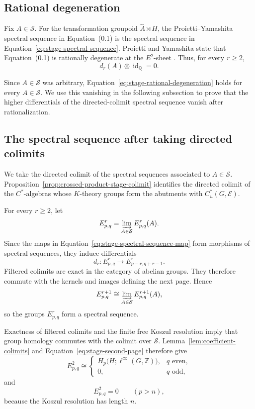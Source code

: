 \documentclass[pdflatex,sn-mathphys-num]{sn-jnl}%
\theoremstyle{plain}
\theoremstyle{remark}
\theoremstyle{definition}
\numberwithin{equation}{section}
\begin{document}
\subsection{Rational degeneration}

Fix \( A\in\mathcal S \). For the transformation groupoid \( \widehat A\rtimes H \), the Proietti--Yamashita spectral sequence in Equation~(0.1) is the spectral sequence in Equation~\eqref{eq:stage-spectral-sequence}. Proietti and Yamashita state that Equation~(0.1) is rationally degenerate at the \( E^2 \)-sheet \cite[p.~2, Equation~(0.1) and the paragraph following it]{proietti2025chern}. Thus, for every \( r\geq2 \),
\begin{equation}
\label{eq:stage-rational-degeneration}
d_r(A)\otimes\operatorname{id}_{\mathbb Q}=0.
\end{equation}

Since \( A\in\mathcal S \) was arbitrary, Equation~\eqref{eq:stage-rational-degeneration} holds for every \( A\in\mathcal S \). We use this vanishing in the following subsection to prove that the higher differentials of the directed-colimit spectral sequence vanish after rationalization.

\subsection{The spectral sequence after taking directed colimits}
\label{sec:the-spectral-sequence-after-taking-directed-colimits}

We take the directed colimit of the spectral sequences associated to \( A\in\mathcal S \). Proposition~\ref{prop:crossed-product-stage-colimit} identifies the directed colimit of the \( C^* \)-algebras whose \( K \)-theory groups form the abutments with \( C_u^*(G,\mathcal E) \).

For every \( r\ge2 \), let
\[
E^r_{p,q}
=
\varinjlim_{A\in\mathcal S}E^r_{p,q}(A).
\]
Since the maps in Equation~\eqref{eq:stage-spectral-sequence-map} form morphisms of spectral sequences, they induce differentials
\[
d_r\colon
E^r_{p,q}
\longrightarrow
E^r_{p-r,q+r-1}.
\]
Filtered colimits are exact in the category of abelian groups. They therefore commute with the kernels and images defining the next page. Hence
\[
E^{r+1}_{p,q}
\cong
\varinjlim_{A\in\mathcal S}E^{r+1}_{p,q}(A),
\]
so the groups \( E^r_{p,q} \) form a spectral sequence.

Exactness of filtered colimits and the finite free Koszul resolution imply that group homology commutes with the colimit over \( \mathcal S \). Lemma~\ref{lem:coefficient-colimits} and Equation~\eqref{eq:stage-second-page} therefore give
\begin{equation}
\label{eq:colimit-second-page}
E^2_{p,q}
\cong
\begin{cases}
H_p\bigl(H;\ell^\infty(G,\mathbb Z)\bigr), & q \text{ even},\\
0, & q \text{ odd},
\end{cases}
\end{equation}
and
\begin{equation}
\label{eq:colimit-horizontal-bound}
E^2_{p,q}=0
\qquad
(p>n),
\end{equation}
because the Koszul resolution has length \( n \).
\end{document}
